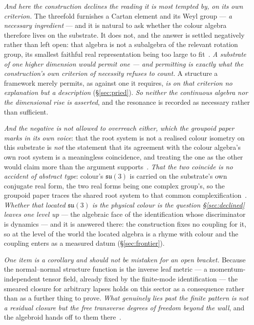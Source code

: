 \documentclass[11pt,a4paper]{article}
\theoremstyle{plain}
\theoremstyle{definition}
\begin{document}
\emph{And here the construction declines the reading it is most tempted by, on its own criterion.} The
threefold furnishes a Cartan element and its Weyl group --- \emph{a necessary ingredient} --- and it is
natural to ask whether the colour algebra therefore lives on the substrate. It does not, and the answer is
settled negatively rather than left open: that algebra is not a subalgebra of the relevant rotation group,
its smallest faithful real representation being too large to fit~\cite{JanzenAlgebroid}. \emph{A substrate of
one higher dimension would permit one --- and permitting is exactly what the construction's own criterion of
necessity refuses to count.} A structure a framework merely permits, as against one it requires, \emph{is on
that criterion no explanation but a description} (\S\ref{sec:pried}). \emph{So neither the continuous algebra
nor the dimensional rise is asserted}, and the resonance is recorded as necessary rather than sufficient.

\emph{And the negative is not allowed to overreach either, which the groupoid paper marks in its own
voice}: that the root system is not a realised colour isometry on this substrate is \emph{not} the statement
that its agreement with the colour algebra's own root system is a meaningless coincidence, and treating the
one as the other would claim more than the argument
supports~\cite{JanzenGroupoid}. \emph{That the two coincide is no accident of abstract type}: colour's
$\mathfrak{su}(3)$ is carried on the substrate's own conjugate real form, the two real forms being one complex group's, so
the groupoid paper traces the shared root system to that common complexification~\cite{JanzenGroupoid}. \emph{Whether
that located $\mathfrak{su}(3)$ is the physical colour is the question \S\ref{sec:declined} leaves one level up} --- the
algebraic face of the identification whose discriminator is dynamics --- and it is answered there: the construction
fixes no coupling for it, so at the level of the world the located algebra is a rhyme with colour and the coupling
enters as a measured datum (\S\ref{sec:frontier}).

\emph{One item is a corollary and should not be mistaken for an open bracket.} Because the normal--normal
structure function is the inverse leaf metric --- a momentum-independent tensor field, already fixed by the
finite-mode identification --- the smeared closure for arbitrary lapses holds on this sector as a
consequence rather than as a further thing to prove. \emph{What genuinely lies past the finite pattern is not
a residual closure but the free transverse degrees of freedom beyond the wall}, and the algebroid hands off
to them there~\cite{JanzenAlgebroid,JanzenDynamics}.
\end{document}
